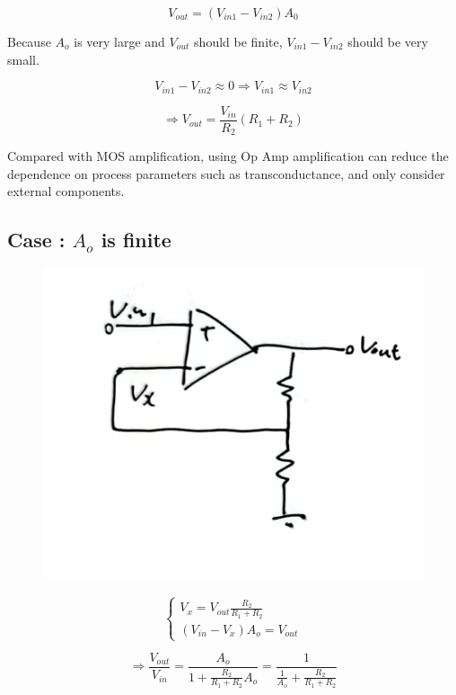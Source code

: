 \documentclass[fontset=windows]{article}
\begin{document}
$$V_{out}=(V_{in1}-V_{in2})A_0$$

Because $A_o$ is very large and $V_{out}$ should be finite, $V_{in1}-V_{in2}$ should be very small. 

$$V_{in1}-V_{in2}\approx0\Longrightarrow V_{in1}\approx V_{in2}$$

$$\Longrightarrow V_{out}=\frac{V_{in}}{R_2}(R_1+R_2)$$

Compared with MOS amplification, using Op Amp amplification can reduce the dependence on process parameters such as transconductance, and only consider external components. 

\subsection*{Case \uppercase\expandafter{}: $A_o$ is finite}

\begin{figure}[htbp]
    \centering
    \includegraphics[scale=0.8]{5.jpg}
    \captionsetup{labelformat=empty}
    \caption{}
    \label{5}
\end{figure}

\begin{equation*}
    \begin{cases}
        V_{x}=V_{out}\frac{R_2}{R_1+R_2} \\
        (V_{in}-V_{x})A_o=V_{out}
    \end{cases}
\end{equation*}

$$\Longrightarrow \frac{V_{out}}{V_{in}}=\frac{A_o}{1+\frac{R_2}{R_1+R_2}A_o}=\frac{1}{\frac{1}{A_o}+\frac{R_2}{R_1+R_2}}$$
\end{document}

